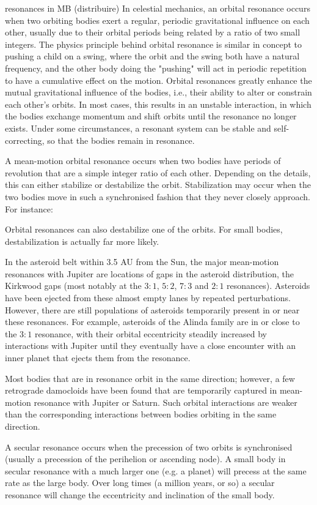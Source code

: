 \begin{wordonframe}{resonances in MB (distribuire)}
In celestial mechanics, an orbital resonance occurs when two orbiting bodies exert a regular, periodic gravitational influence on each other, usually due to their orbital periods being related by a ratio of two small integers. The physics principle behind orbital resonance is similar in concept to pushing a child on a swing, where the orbit and the swing both have a natural frequency, and the other body doing the "pushing" will act in periodic repetition to have a cumulative effect on the motion. Orbital resonances greatly enhance the mutual gravitational influence of the bodies, i.e., their ability to alter or constrain each other's orbits. In most cases, this results in an unstable interaction, in which the bodies exchange momentum and shift orbits until the resonance no longer exists. Under some circumstances, a resonant system can be stable and self-correcting, so that the bodies remain in resonance.

A mean-motion orbital resonance occurs when two bodies have periods of revolution that are a simple integer ratio of each other. Depending on the details, this can either stabilize or destabilize the orbit. Stabilization may occur when the two bodies move in such a synchronised fashion that they never closely approach. For instance:

Orbital resonances can also destabilize one of the orbits. For small bodies, destabilization is actually far more likely.

In the asteroid belt within 3.5 AU from the Sun, the major mean-motion resonances with Jupiter are locations of gaps in the asteroid distribution, the Kirkwood gaps (most notably at the $3:1$, $5:2$, $7:3$ and $2:1$ resonances). Asteroids have been ejected from these almost empty lanes by repeated perturbations. However, there are still populations of asteroids temporarily present in or near these resonances. For example, asteroids of the Alinda family are in or close to the $3:1$ resonance, with their orbital eccentricity steadily increased by interactions with Jupiter until they eventually have a close encounter with an inner planet that ejects them from the resonance.

Most bodies that are in resonance orbit in the same direction; however, a few retrograde damocloids have been found that are temporarily captured in mean-motion resonance with Jupiter or Saturn. Such orbital interactions are weaker than the corresponding interactions between bodies orbiting in the same direction.

A secular resonance occurs when the precession of two orbits is synchronised (usually a precession of the perihelion or ascending node). A small body in secular resonance with a much larger one (e.g. a planet) will precess at the same rate as the large body. Over long times (a million years, or so) a secular resonance will change the eccentricity and inclination of the small body.
\end{wordonframe}

